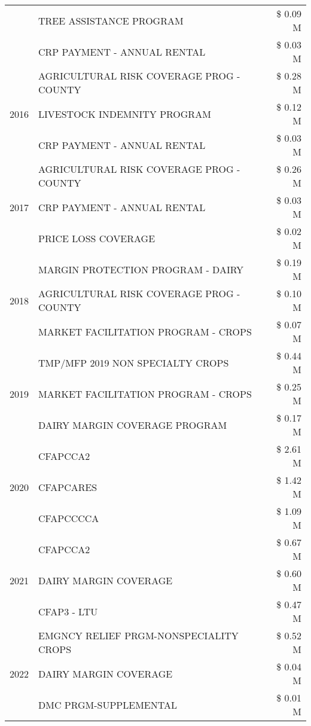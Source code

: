 \begin{tabular}{llr}
 & TREE ASSISTANCE PROGRAM & \$ 0.09 M \\
 & CRP PAYMENT - ANNUAL RENTAL & \$ 0.03 M \\
\cline{1-3}
\multirow[t]{3}{*}{2016} & AGRICULTURAL RISK COVERAGE PROG - COUNTY & \$ 0.28 M \\
 & LIVESTOCK INDEMNITY PROGRAM & \$ 0.12 M \\
 & CRP PAYMENT - ANNUAL RENTAL & \$ 0.03 M \\
\cline{1-3}
\multirow[t]{3}{*}{2017} & AGRICULTURAL RISK COVERAGE PROG - COUNTY & \$ 0.26 M \\
 & CRP PAYMENT - ANNUAL RENTAL & \$ 0.03 M \\
 & PRICE LOSS COVERAGE & \$ 0.02 M \\
\cline{1-3}
\multirow[t]{3}{*}{2018} & MARGIN PROTECTION PROGRAM - DAIRY & \$ 0.19 M \\
 & AGRICULTURAL RISK COVERAGE PROG - COUNTY & \$ 0.10 M \\
 & MARKET FACILITATION PROGRAM - CROPS & \$ 0.07 M \\
\cline{1-3}
\multirow[t]{3}{*}{2019} & TMP/MFP 2019 NON SPECIALTY CROPS & \$ 0.44 M \\
 & MARKET FACILITATION PROGRAM - CROPS & \$ 0.25 M \\
 & DAIRY MARGIN COVERAGE PROGRAM & \$ 0.17 M \\
\cline{1-3}
\multirow[t]{3}{*}{2020} & CFAPCCA2 & \$ 2.61 M \\
 & CFAPCARES & \$ 1.42 M \\
 & CFAPCCCCA & \$ 1.09 M \\
\cline{1-3}
\multirow[t]{3}{*}{2021} & CFAPCCA2 & \$ 0.67 M \\
 & DAIRY MARGIN COVERAGE & \$ 0.60 M \\
 & CFAP3 - LTU & \$ 0.47 M \\
\cline{1-3}
\multirow[t]{3}{*}{2022} & EMGNCY RELIEF PRGM-NONSPECIALITY CROPS & \$ 0.52 M \\
 & DAIRY MARGIN COVERAGE & \$ 0.04 M \\
 & DMC PRGM-SUPPLEMENTAL & \$ 0.01 M \\
\cline{1-3}
\bottomrule
\end{tabular}
